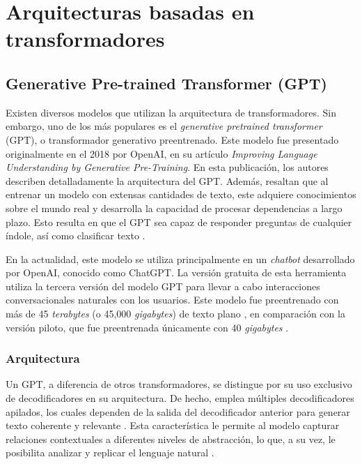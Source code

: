 \section{Arquitecturas basadas en transformadores}


\subsection{Generative Pre-trained Transformer (GPT)}

Existen diversos modelos que utilizan la arquitectura de transformadores. Sin embargo, uno de los más populares es el \textit{generative pretrained transformer} (GPT), o transformador generativo preentrenado. Este modelo fue presentado originalmente en el 2018 por OpenAI, en su artículo \textit{Improving Language Understanding by Generative Pre-Training}. En esta publicación, los autores describen detalladamente la arquitectura del GPT. Además, resaltan que al entrenar un modelo con extensas cantidades de texto, este adquiere conocimientos sobre el mundo real y desarrolla la capacidad de procesar dependencias a largo plazo. Esto resulta en que el GPT sea capaz de responder preguntas de cualquier índole, así como clasificar texto \cite{twentyseven}.

En la actualidad, este modelo se utiliza principalmente en un \textit{chatbot} desarrollado por OpenAI, conocido como ChatGPT. La versión gratuita de esta herramienta utiliza la tercera versión del modelo GPT para llevar a cabo interacciones conversacionales naturales con los usuarios. Este modelo fue preentrenado con más de 45 \textit{terabytes} (o 45,000 \textit{gigabytes}) de texto plano \cite{twentyeight}, en comparación con la versión piloto, que fue preentrenada únicamente con 40 \textit{gigabytes} \cite{twentynine}. 

\subsubsection{Arquitectura}

Un GPT, a diferencia de otros transformadores, se distingue por su uso exclusivo de decodificadores en su arquitectura. De hecho, emplea múltiples decodificadores apilados, los cuales dependen de la salida del decodificador anterior para generar texto coherente y relevante \cite{thirty}. Esta característica le permite al modelo capturar relaciones contextuales a diferentes niveles de abstracción, lo que, a su vez, le posibilita analizar y replicar el lenguaje natural \cite{thirtyone}.

